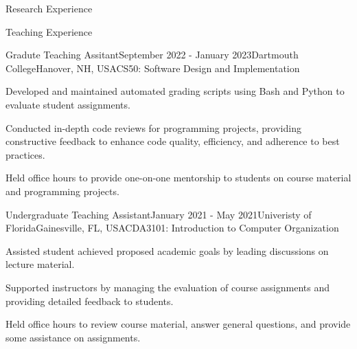 \documentclass{resume} %
\begin{document}
\begin{rSection}{Research Experience}
\end{rSection}
\begin{rSection}{Teaching Experience}
\begin{rSubsection_ta}{Gradute Teaching Assitant}{September 2022 - January 2023}{Dartmouth College}{Hanover, NH, USA}{CS50: Software Design and Implementation}
  \item Developed and maintained automated grading scripts using Bash and Python to evaluate student assignments.
  \item Conducted in-depth code reviews for programming projects, providing constructive feedback to enhance code quality, efficiency, and adherence to best practices.
  \item Held office hours to provide one-on-one mentorship to students on course material and programming projects.
\end{rSubsection_ta}
\begin{rSubsection_ta}{Undergraduate Teaching Assistant}{January 2021 - May 2021}{Univeristy of Florida}{Gainesville, FL, USA}{CDA3101: Introduction to Computer Organization}
\item Assisted student achieved proposed academic goals by leading discussions on lecture material. 
\item Supported instructors by managing the evaluation of course assignments and providing detailed feedback to students.
\item Held office hours to review course material, answer general questions, and provide some assistance on assignments.
\end{rSubsection_ta}
\end{rSection}
\end{document}
